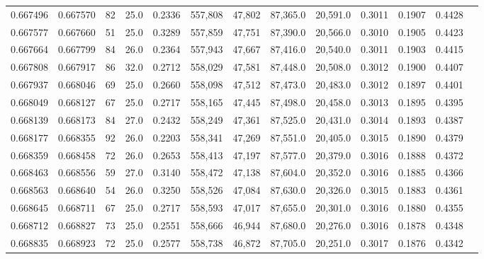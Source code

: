 \begin{tabular}{rrrrrrrrrrrrr}
0.667496 & 0.667570 &    82 & 25.0 &                                     0.2336 & 557,808 &  47,802 &  87,365.0 &  20,591.0 & 0.3011 & 0.1907 & 0.4428 \\
0.667577 & 0.667660 &    51 & 25.0 &                                     0.3289 & 557,859 &  47,751 &  87,390.0 &  20,566.0 & 0.3010 & 0.1905 & 0.4423 \\
0.667664 & 0.667799 &    84 & 26.0 &                                     0.2364 & 557,943 &  47,667 &  87,416.0 &  20,540.0 & 0.3011 & 0.1903 & 0.4415 \\
0.667808 & 0.667917 &    86 & 32.0 &                                     0.2712 & 558,029 &  47,581 &  87,448.0 &  20,508.0 & 0.3012 & 0.1900 & 0.4407 \\
0.667937 & 0.668046 &    69 & 25.0 &                                     0.2660 & 558,098 &  47,512 &  87,473.0 &  20,483.0 & 0.3012 & 0.1897 & 0.4401 \\
0.668049 & 0.668127 &    67 & 25.0 &                                     0.2717 & 558,165 &  47,445 &  87,498.0 &  20,458.0 & 0.3013 & 0.1895 & 0.4395 \\
0.668139 & 0.668173 &    84 & 27.0 &                                     0.2432 & 558,249 &  47,361 &  87,525.0 &  20,431.0 & 0.3014 & 0.1893 & 0.4387 \\
0.668177 & 0.668355 &    92 & 26.0 &                                     0.2203 & 558,341 &  47,269 &  87,551.0 &  20,405.0 & 0.3015 & 0.1890 & 0.4379 \\
0.668359 & 0.668458 &    72 & 26.0 &                                     0.2653 & 558,413 &  47,197 &  87,577.0 &  20,379.0 & 0.3016 & 0.1888 & 0.4372 \\
0.668463 & 0.668556 &    59 & 27.0 &                                     0.3140 & 558,472 &  47,138 &  87,604.0 &  20,352.0 & 0.3016 & 0.1885 & 0.4366 \\
0.668563 & 0.668640 &    54 & 26.0 &                                     0.3250 & 558,526 &  47,084 &  87,630.0 &  20,326.0 & 0.3015 & 0.1883 & 0.4361 \\
0.668645 & 0.668711 &    67 & 25.0 &                                     0.2717 & 558,593 &  47,017 &  87,655.0 &  20,301.0 & 0.3016 & 0.1880 & 0.4355 \\
0.668712 & 0.668827 &    73 & 25.0 &                                     0.2551 & 558,666 &  46,944 &  87,680.0 &  20,276.0 & 0.3016 & 0.1878 & 0.4348 \\
0.668835 & 0.668923 &    72 & 25.0 &                                     0.2577 & 558,738 &  46,872 &  87,705.0 &  20,251.0 & 0.3017 & 0.1876 & 0.4342 \\

\end{tabular}
